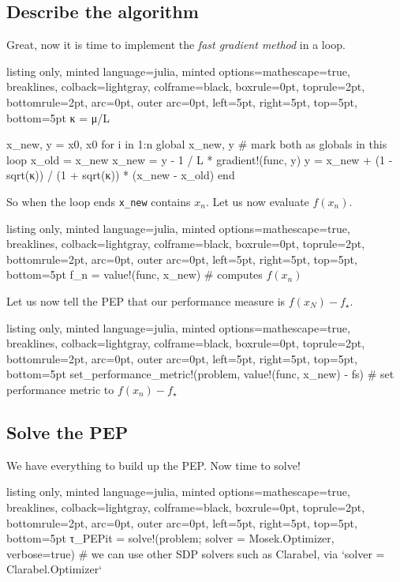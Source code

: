 \documentclass{article}
\begin{document}
\subsection{Describe the algorithm}

Great, now it is time to implement the \emph{fast gradient method} in a loop. 

\begin{tcblisting}{listing only, minted language=julia, minted options={mathescape=true, breaklines}, colback=lightgray, colframe=black, boxrule=0pt, toprule=2pt, bottomrule=2pt, arc=0pt, outer arc=0pt, left=5pt, right=5pt, top=5pt, bottom=5pt}
κ = μ/L

x_new, y = x0, x0
for i in 1:n
    global x_new, y  # mark both as globals in this loop
    x_old = x_new
    x_new = y - 1 / L * gradient!(func, y)
    y = x_new + (1 - sqrt(κ)) / (1 + sqrt(κ)) * (x_new - x_old)
end
\end{tcblisting}


So when the loop ends \texttt{x\_new} contains $x_n$. Let us now evaluate $f(x_n)$.

\begin{tcblisting}{listing only, minted language=julia, minted options={mathescape=true, breaklines}, colback=lightgray, colframe=black, boxrule=0pt, toprule=2pt, bottomrule=2pt, arc=0pt, outer arc=0pt, left=5pt, right=5pt, top=5pt, bottom=5pt}
f_n = value!(func, x_new) # computes $f(x_n)$
\end{tcblisting}


Let us now tell the PEP that our performance measure is $f(x_N) - f_\star$.

\begin{tcblisting}{listing only, minted language=julia, minted options={mathescape=true, breaklines}, colback=lightgray, colframe=black, boxrule=0pt, toprule=2pt, bottomrule=2pt, arc=0pt, outer arc=0pt, left=5pt, right=5pt, top=5pt, bottom=5pt}
set_performance_metric!(problem, value!(func, x_new) - fs) # set performance metric to $f(x_n) - f_\star$
\end{tcblisting}


\subsection{Solve the PEP}
We have everything to build up the PEP. Now time to solve!

\begin{tcblisting}{listing only, minted language=julia, minted options={mathescape=true, breaklines}, colback=lightgray, colframe=black, boxrule=0pt, toprule=2pt, bottomrule=2pt, arc=0pt, outer arc=0pt, left=5pt, right=5pt, top=5pt, bottom=5pt}
τ_PEPit = solve!(problem; solver = Mosek.Optimizer, verbose=true) # we can use other SDP solvers such as Clarabel, via `solver = Clarabel.Optimizer`
\end{tcblisting}
\end{document}
